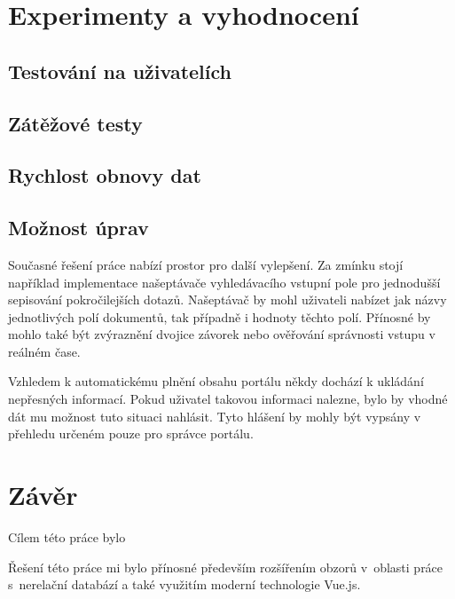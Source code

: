 \chapter{Experimenty a vyhodnocení}
\blindtext

\section{Testování na uživatelích}
\blindtext[2]

\section{Zátěžové testy}
\blindtext[2]

\section{Rychlost obnovy dat}
\blindtext[2]

\section{Možnost úprav}
Současné řešení práce nabízí prostor pro další vylepšení. Za zmínku stojí například implementace našeptávače vyhledávacího vstupní pole pro jednodušší sepisování pokročilejších dotazů. Našeptávač by mohl uživateli nabízet jak názvy jednotlivých polí dokumentů, tak případně i hodnoty těchto polí. Přínosné by mohlo také být zvýraznění dvojice závorek nebo ověřování správnosti vstupu v reálném čase.

Vzhledem k automatickému plnění obsahu portálu někdy dochází k ukládání nepřesných informací. Pokud uživatel takovou informaci nalezne, bylo by vhodné dát mu možnost tuto situaci nahlásit. Tyto hlášení by mohly být vypsány v přehledu určeném pouze pro správce portálu. 

\blindtext



\chapter{Závěr}
Cílem této práce bylo \blindtext

\blindtext %

Řešení této práce mi bylo přínosné především rozšířením obzorů v~oblasti práce s~nerelační databází a také využitím moderní technologie Vue.js.